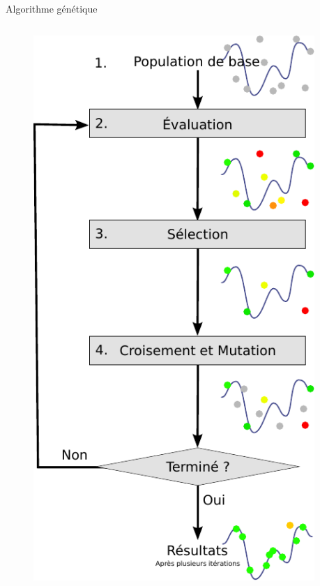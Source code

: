 
\begin{frame}{Algorithme génétique}
  \begin{columns}
      \begin{column}{0.48\textwidth}
        \begin{figure}
          \includegraphics[scale=.5]{../img/algo_genetique.pdf}
        \end{figure}
      \end{column}
      \begin{column}{0.48\textwidth}

\end{column}
\end{columns}
\end{frame}
